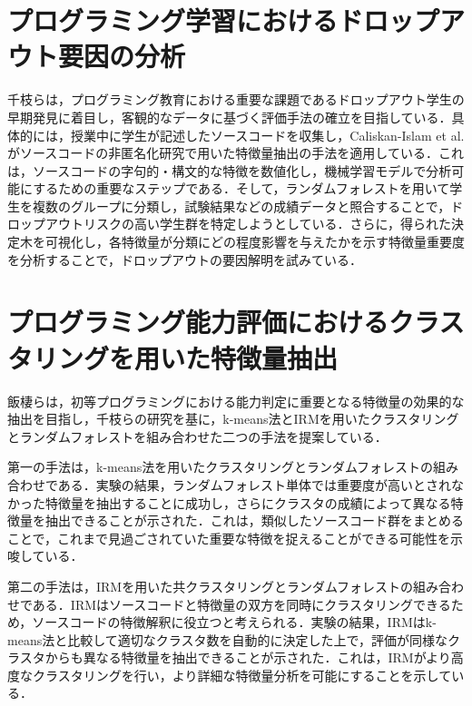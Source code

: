 \documentclass[11pt]{jreport}
\begin{document}
\section{プログラミング学習におけるドロップアウト要因の分析}
千枝ら\cite{chieda}は，プログラミング教育における重要な課題であるドロップアウト学生の早期発見に着目し，客観的なデータに基づく評価手法の確立を目指している．具体的には，授業中に学生が記述したソースコードを収集し，Caliskan-Islam et al.\cite{cali}がソースコードの非匿名化研究で用いた特徴量抽出の手法を適用している．これは，ソースコードの字句的・構文的な特徴を数値化し，機械学習モデルで分析可能にするための重要なステップである．そして，ランダムフォレストを用いて学生を複数のグループに分類し，試験結果などの成績データと照合することで，ドロップアウトリスクの高い学生群を特定しようとしている．さらに，得られた決定木を可視化し，各特徴量が分類にどの程度影響を与えたかを示す特徴量重要度を分析することで，ドロップアウトの要因解明を試みている．
\section{プログラミング能力評価におけるクラスタリングを用いた特徴量抽出}
飯棲ら\cite{izumi}は，初等プログラミングにおける能力判定に重要となる特徴量の効果的な抽出を目指し，千枝らの研究\cite{chieda}を基に，k-means法とIRMを用いたクラスタリングとランダムフォレストを組み合わせた二つの手法を提案している．

第一の手法は，k-means法を用いたクラスタリングとランダムフォレストの組み合わせである．実験の結果，ランダムフォレスト単体では重要度が高いとされなかった特徴量を抽出することに成功し，さらにクラスタの成績によって異なる特徴量を抽出できることが示された．これは，類似したソースコード群をまとめることで，これまで見過ごされていた重要な特徴を捉えることができる可能性を示唆している．

第二の手法は，IRMを用いた共クラスタリングとランダムフォレストの組み合わせである．IRMはソースコードと特徴量の双方を同時にクラスタリングできるため，ソースコードの特徴解釈に役立つと考えられる．実験の結果，IRMはk-means法と比較して適切なクラスタ数を自動的に決定した上で，評価が同様なクラスタからも異なる特徴量を抽出できることが示された．これは，IRMがより高度なクラスタリングを行い，より詳細な特徴量分析を可能にすることを示している．
\end{document}
